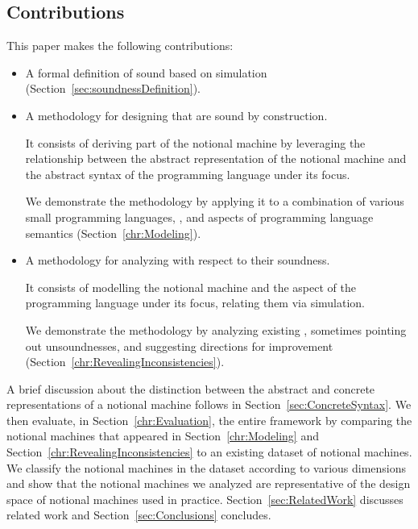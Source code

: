 \subsection{Contributions}
This paper makes the following contributions:
\begin{itemize}
    \item A formal definition of sound \nm{} based on simulation (Section~\ref{sec:soundnessDefinition}).
    \item A methodology for designing \nms{} that are sound by construction.

        It consists of
        deriving part of the notional machine
        by leveraging
        the relationship between
        the abstract representation of the notional machine
        and
        the abstract syntax of the programming language under its focus.

        We demonstrate the methodology by applying it
        to a combination of various
        small programming languages,
        \nms{},
        and
        aspects of programming language semantics
        (Section~\ref{chr:Modeling}).

    \item A methodology for analyzing \nms{} with respect to their soundness.

        It consists of
        modelling the notional machine and
        the aspect of the programming language under its focus,
        relating them via simulation. %

        We
        demonstrate
        the methodology by
        analyzing
        existing \nms{},
        sometimes
        pointing out unsoundnesses, and suggesting directions for improvement (Section~\ref{chr:RevealingInconsistencies}).
\end{itemize}

A brief discussion about the distinction between the abstract and concrete representations of a notional machine
follows
in Section~\ref{sec:ConcreteSyntax}.
We then
evaluate, in Section~\ref{chr:Evaluation}, the entire framework  %
by comparing the notional machines that appeared
in Section~\ref{chr:Modeling} and Section~\ref{chr:RevealingInconsistencies}
to an existing dataset of \numOfNMs notional machines.
We classify the notional machines in the dataset according to various dimensions and show that the notional machines we analyzed are representative of the design space of notional machines used in practice.
Section~\ref{sec:RelatedWork} discusses related work
and Section~\ref{sec:Conclusions} concludes.



